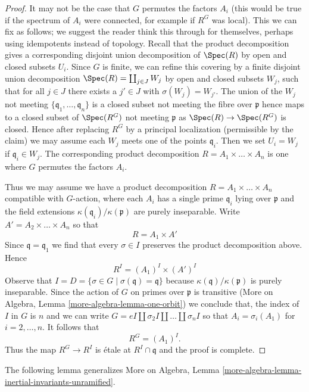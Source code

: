 \begin{proof}
\medskip\noindent
It may not be the case that $G$ permutes the factors $A_i$
(this would be true if the spectrum of $A_i$ were connected,
for example if $R^G$ was local). This we can fix as follows;
we suggest the reader think this through for themselves, perhaps
using idempotents instead of topology.
Recall that the product decomposition gives a corresponding
disjoint union decomposition of $\Spec(R)$ by open and closed
subsets $U_i$. Since $G$ is finite, we can refine this covering
by a finite disjoint union decomposition
$\Spec(R) = \coprod_{j \in J} W_j$ by open
and closed subsets $W_j$, such that for all $j \in J$ there exists
a $j' \in J$ with $\sigma(W_j) = W_{j'}$. The union of the
$W_j$ not meeting $\{\mathfrak q_1, \ldots, \mathfrak q_n\}$
is a closed subset not meeting the fibre over $\mathfrak p$
hence maps to a closed subset of $\Spec(R^G)$ not meeting
$\mathfrak p$ as $\Spec(R) \to \Spec(R^G)$ is closed.
Hence after replacing $R^G$ by a principal localization
(permissible by the claim) we may assume each $W_j$ meets
one of the points $\mathfrak q_i$. Then we set $U_i = W_j$
if $\mathfrak q_i \in W_j$. The corresponding product decomposition
$R = A_1 \times \ldots \times A_n$ is one
where $G$ permutes the factors $A_i$.

\medskip\noindent
Thus we may assume we have a product decomposition
$R = A_1 \times \ldots \times A_n$ compatible with $G$-action,
where each $A_i$ has a single prime $\mathfrak q_i$ lying
over $\mathfrak p$ and the field extensions
$\kappa(\mathfrak q_i)/\kappa(\mathfrak p)$ are purely inseparable.
Write $A' = A_2 \times \ldots \times A_n$ so that
$$
R = A_1 \times A'
$$
Since $\mathfrak q = \mathfrak q_1$ we find that every
$\sigma \in I$ preserves the product decomposition above.
Hence
$$
R^I = (A_1)^I \times (A')^I
$$
Observe that $I = D = \{\sigma \in G \mid \sigma(\mathfrak q) = \mathfrak q\}$
because $\kappa(\mathfrak q)/\kappa(\mathfrak p)$ is purely inseparable.
Since the action of $G$ on primes over $\mathfrak p$ is transitive
(More on Algebra, Lemma \ref{more-algebra-lemma-one-orbit})
we conclude that, the index of $I$ in $G$ is $n$ and we can write
$G = eI \amalg \sigma_2I \amalg \ldots \amalg \sigma_nI$ so that
$A_i = \sigma_i(A_1)$ for $i = 2, \ldots, n$. It follows that
$$
R^G = (A_1)^I.
$$
Thus the map $R^G \to R^I$ is \'etale at $R^I \cap \mathfrak q$
and the proof is complete.
\end{proof}

\noindent
The following lemma generalizes
More on Algebra, Lemma \ref{more-algebra-lemma-inertial-invariants-unramified}.

